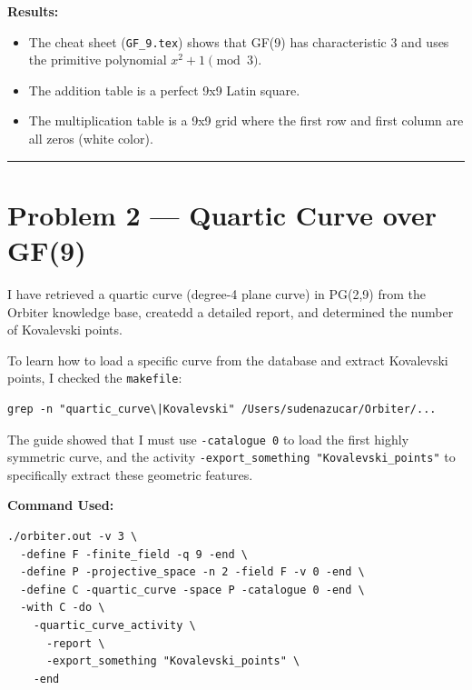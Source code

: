 \documentclass[12pt,a4paper]{article}
\begin{document}
\textbf{Results:}
\begin{itemize}
    \item The cheat sheet (\texttt{GF\_9.tex}) shows that GF(9) has characteristic 3 and uses the primitive polynomial $x^2 + 1 \pmod 3$.
    \item The addition table is a perfect 9x9 Latin square.
    \item The multiplication table is a 9x9 grid where the first row and first column are all zeros (white color).
\end{itemize}

\vspace{0.5cm}
\hrule
\vspace{0.5cm}

\section*{Problem 2 --- Quartic Curve over GF(9)}

I have retrieved a quartic curve (degree-4 plane curve) in PG(2,9) from the Orbiter knowledge base, createdd a detailed report, and determined the number of Kovalevski points.

To learn how to load a specific curve from the database and extract Kovalevski points, I checked the \texttt{makefile}:
\begin{verbatim}
grep -n "quartic_curve\|Kovalevski" /Users/sudenazucar/Orbiter/...
\end{verbatim}
The guide showed that I must use \texttt{-catalogue 0} to load the first highly symmetric curve, and the activity \texttt{-export\_something "Kovalevski\_points"} to specifically extract these geometric features.

\vspace{0.3cm}\noindent\textbf{Command Used:}
\begin{verbatim}
./orbiter.out -v 3 \
  -define F -finite_field -q 9 -end \
  -define P -projective_space -n 2 -field F -v 0 -end \
  -define C -quartic_curve -space P -catalogue 0 -end \
  -with C -do \
    -quartic_curve_activity \
      -report \
      -export_something "Kovalevski_points" \
    -end
\end{verbatim}
\end{document}
